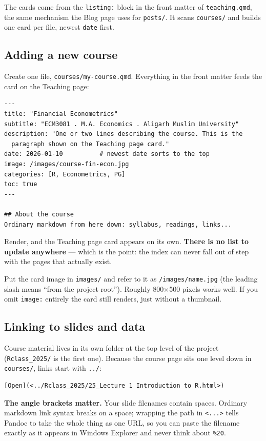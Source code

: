 \documentclass[11pt,a4paper]{article}
\newcommand{\file}[1]{\texttt{#1}}
\begin{document}
The cards come from the \texttt{listing:} block in the front matter of
\file{teaching.qmd}, the same mechanism the Blog page uses for
\file{posts/}. It scans \file{courses/} and builds one card per file, newest
\texttt{date} first.

\subsection{Adding a new course}\label{sec:newcourse}

Create one file, \file{courses/my-course.qmd}. Everything in the front
matter feeds the card on the Teaching page:

\begin{lstlisting}
---
title: "Financial Econometrics"
subtitle: "ECM3081 . M.A. Economics . Aligarh Muslim University"
description: "One or two lines describing the course. This is the
  paragraph shown on the Teaching page card."
date: 2026-01-10          # newest date sorts to the top
image: /images/course-fin-econ.jpg
categories: [R, Econometrics, PG]
toc: true
---

## About the course
Ordinary markdown from here down: syllabus, readings, links...
\end{lstlisting}

Render, and the Teaching page card appears on its own. \textbf{There is no
list to update anywhere} --- which is the point: the index can never fall
out of step with the pages that actually exist.

Put the card image in \file{images/} and refer to it as
\file{/images/name.jpg} (the leading slash means ``from the project root'').
Roughly 800$\times$500 pixels works well. If you omit \texttt{image:}
entirely the card still renders, just without a thumbnail.

\subsection{Linking to slides and data}\label{sec:slidelinks}

Course material lives in its own folder at the top level of the project
(\file{Rclass\_2025/} is the first one). Because the course page sits one
level down in \file{courses/}, links start with \texttt{../}:

\begin{lstlisting}
[Open](<../Rclass_2025/25_Lecture 1 Introduction to R.html>)
\end{lstlisting}

\textbf{The angle brackets matter.} Your slide filenames contain spaces.
Ordinary markdown link syntax breaks on a space; wrapping the path in
\texttt{<...>} tells Pandoc to take the whole thing as one URL, so you can
paste the filename exactly as it appears in Windows Explorer and never
think about \texttt{\%20}.
\end{document}

